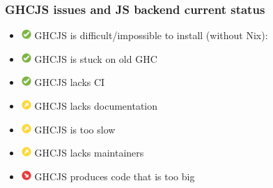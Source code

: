 \documentclass{beamer}
\begin{document}
\begin{frame}
\frametitle{GHCJS issues and JS backend current status}
\begin{itemize}
\item[]
\includegraphics[height=1em]{images/check_green.png}
GHCJS is difficult/impossible to install (without Nix):

\item[]
\includegraphics[height=1em]{images/check_green.png}
GHCJS is stuck on old GHC

\item[]
\includegraphics[height=1em]{images/check_green.png}
GHCJS lacks CI

\item[]
\includegraphics[height=1em]{images/arrow-up-right-yellow.png}
GHCJS lacks documentation

\item[]
\includegraphics[height=1em]{images/arrow-up-right-yellow.png}
GHCJS is too slow

\item[]
\includegraphics[height=1em]{images/arrow-up-right-yellow.png}
GHCJS lacks maintainers

\item[]
\includegraphics[height=1em]{images/arrow-down-right-red.svg.png}
GHCJS produces code that is too big

\end{itemize}
\end{frame}
\end{document}
